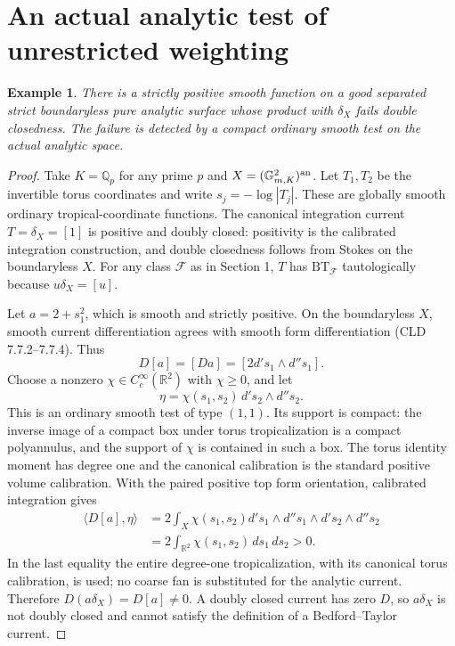 \documentclass[11pt]{article}
\newtheorem{example}[theorem]{Example}
\newcommand{\dp}{d'}
\newcommand{\ddp}{d''}
\newcommand{\BT}{\mathrm{BT}}
\begin{document}
\section{An actual analytic test of unrestricted weighting}
\begin{example}\label{ex:failure}
There is a strictly positive smooth function on a good separated strict
boundaryless pure analytic surface whose product with $\delta_X$ fails
double closedness. The failure is detected by a compact ordinary smooth
test on the actual analytic space.
\end{example}
\begin{proof}
Take $K=\mathbb Q_p$ for any prime $p$ and
$X=(\mathbb G_{m,K}^2)^{\rm an}$. Let $T_1,T_2$ be the invertible torus
coordinates and write $s_j=-\log|T_j|$. These are globally smooth
ordinary tropical-coordinate functions. The canonical integration
current $T=\delta_X=[1]$ is positive and doubly closed: positivity is the
calibrated integration construction, and double closedness follows from
Stokes on the boundaryless $X$. For any class $\mathcal F$ as in Section 1,
$T$ has $\BT_{\mathcal F}$ tautologically because $u\delta_X=[u]$.

Let $a=2+s_1^2$, which is smooth and strictly positive. On the boundaryless
$X$, smooth current differentiation agrees with smooth form
differentiation (CLD 7.7.2--7.7.4). Thus
\[
 D[a]=[Da]=[2\dp s_1\wedge\ddp s_1].
\]
Choose a nonzero $\chi\in C_c^\infty(\mathbb R^2)$ with $\chi\geq0$, and
let
\[
 \eta=\chi(s_1,s_2)\,\dp s_2\wedge\ddp s_2.
\]
This is an ordinary smooth test of type $(1,1)$. Its support is compact:
the inverse image of a compact box under torus tropicalization is a
compact polyannulus, and the support of $\chi$ is contained in such a box.
The torus identity moment has degree one and the canonical calibration is
the standard positive volume calibration. With the paired positive top
form orientation, calibrated integration gives
\begin{align*}
 \langle D[a],\eta\rangle
 &=2\int_X\chi(s_1,s_2)
       \dp s_1\wedge\ddp s_1\wedge\dp s_2\wedge\ddp s_2\\
 &=2\int_{\mathbb R^2}\chi(s_1,s_2)\,ds_1\,ds_2>0.
\end{align*}
In the last equality the entire degree-one tropicalization, with its
canonical torus calibration, is used; no coarse fan is substituted for
the analytic current. Therefore $D(a\delta_X)=D[a]\ne0$. A doubly
closed current has zero $D$, so $a\delta_X$ is not doubly closed and
cannot satisfy the definition of a Bedford--Taylor current.
\end{proof}
\end{document}
